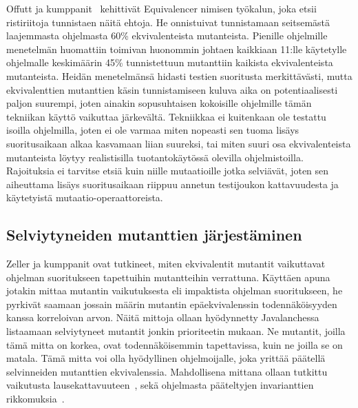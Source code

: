\documentclass[finnish]{tktltiki2}
\begin{document}
Offutt ja kumppanit~\cite{507890} kehittivät Equivalencer nimisen työkalun, joka etsii ristiriitoja tunnistaen näitä ehtoja. He onnistuivat tunnistamaan seitsemästä laajemmasta ohjelmasta 60\% ekvivalenteista mutanteista. Pienille ohjelmille menetelmän huomattiin toimivan huonommin johtaen kaikkiaan 11:lle käytetylle ohjelmalle keskimäärin 45\% tunnistettuun mutanttiin kaikista ekvivalenteista mutanteista. Heidän menetelmänsä hidasti testien suoritusta merkittävästi, mutta ekvivalenttien mutanttien käsin tunnistamiseen kuluva aika on potentiaalisesti paljon suurempi, joten ainakin sopusuhtaisen kokoisille ohjelmille tämän tekniikan käyttö vaikuttaa järkevältä. Tekniikkaa ei kuitenkaan ole testattu isoilla ohjelmilla, joten ei ole varmaa miten nopeasti sen tuoma lisäys suoritusaikaan alkaa kasvamaan liian suureksi, tai miten suuri osa ekvivalenteista mutanteista löytyy realistisilla tuotantokäytössä olevilla ohjelmistoilla. Rajoituksia ei tarvitse etsiä kuin niille mutaatioille jotka selviävät, joten sen aiheuttama lisäys suoritusaikaan riippuu annetun testijoukon kattavuudesta ja käytetyistä mu\-taa\-tio\--ope\-raatto\-reista.

\subsection{Selviytyneiden mutanttien järjestäminen}
Zeller ja kumppanit ovat tutkineet, miten ekvivalentit mutantit vaikuttavat ohjelman suoritukseen tapettuihin mutantteihin verrattuna. Käyttäen apuna jotakin mittaa mutantin vaikutuksesta eli impaktista ohjelman suoritukseen, he pyrkivät saamaan jossain määrin mutantin epäekvivalenssin todennäköisyyden kanssa korreloivan arvon. Näitä mittoja ollaan hyödynnetty Javalanchessa listaamaan selviytyneet mutantit jonkin prioriteetin mukaan. Ne mutantit, joilla tämä mitta on korkea, ovat todennäköisemmin tapettavissa, kuin ne joilla se on matala. Tämä mitta voi olla hyödyllinen ohjelmoijalle, joka yrittää päätellä selvinneiden mutanttien ekvivalenssia. Mahdollisena mittana ollaan tutkittu vaikutusta lausekattavuuteen~\cite{GrunSZ09, SchulerZ10}, sekä ohjelmasta pääteltyjen invarianttien rikkomuksia~\cite{SchulerDZ09}.
\end{document}
